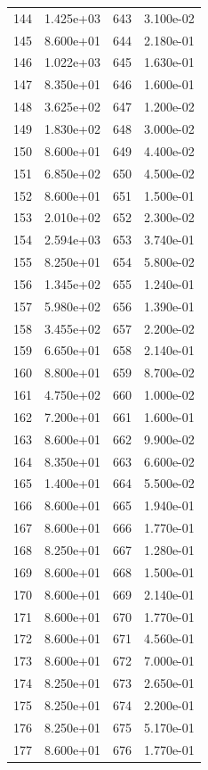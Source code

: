 \documentclass[12pt]{article}
\begin{document}
\begin{longtable}{@{}cccc@{}}
144 & 1.425e+03 & 643 & 3.100e-02 \\
145 & 8.600e+01 & 644 & 2.180e-01 \\
146 & 1.022e+03 & 645 & 1.630e-01 \\
147 & 8.350e+01 & 646 & 1.600e-01 \\
148 & 3.625e+02 & 647 & 1.200e-02 \\
149 & 1.830e+02 & 648 & 3.000e-02 \\
150 & 8.600e+01 & 649 & 4.400e-02 \\
151 & 6.850e+02 & 650 & 4.500e-02 \\
152 & 8.600e+01 & 651 & 1.500e-01 \\
153 & 2.010e+02 & 652 & 2.300e-02 \\
154 & 2.594e+03 & 653 & 3.740e-01 \\
155 & 8.250e+01 & 654 & 5.800e-02 \\
156 & 1.345e+02 & 655 & 1.240e-01 \\
157 & 5.980e+02 & 656 & 1.390e-01 \\
158 & 3.455e+02 & 657 & 2.200e-02 \\
159 & 6.650e+01 & 658 & 2.140e-01 \\
160 & 8.800e+01 & 659 & 8.700e-02 \\
161 & 4.750e+02 & 660 & 1.000e-02 \\
162 & 7.200e+01 & 661 & 1.600e-01 \\
163 & 8.600e+01 & 662 & 9.900e-02 \\
164 & 8.350e+01 & 663 & 6.600e-02 \\
165 & 1.400e+01 & 664 & 5.500e-02 \\
166 & 8.600e+01 & 665 & 1.940e-01 \\
167 & 8.600e+01 & 666 & 1.770e-01 \\
168 & 8.250e+01 & 667 & 1.280e-01 \\
169 & 8.600e+01 & 668 & 1.500e-01 \\
170 & 8.600e+01 & 669 & 2.140e-01 \\
171 & 8.600e+01 & 670 & 1.770e-01 \\
172 & 8.600e+01 & 671 & 4.560e-01 \\
173 & 8.600e+01 & 672 & 7.000e-01 \\
174 & 8.250e+01 & 673 & 2.650e-01 \\
175 & 8.250e+01 & 674 & 2.200e-01 \\
176 & 8.250e+01 & 675 & 5.170e-01 \\
177 & 8.600e+01 & 676 & 1.770e-01 \\

\end{longtable}
\end{document}

